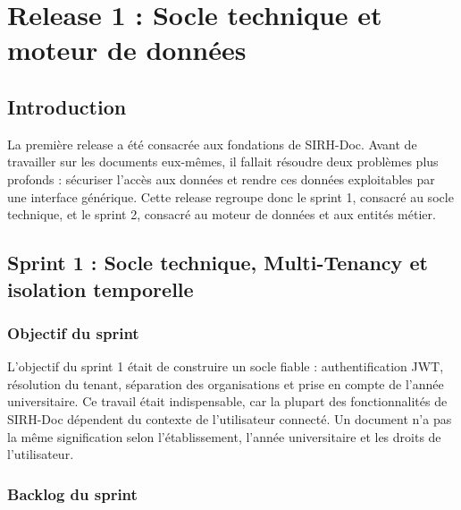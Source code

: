 
\chapter{Release 1 : Socle technique et moteur de données}

\section{Introduction}

La première release a été consacrée aux fondations de SIRH-Doc. Avant de travailler sur les documents eux-mêmes, il fallait résoudre deux problèmes plus profonds : sécuriser l'accès aux données et rendre ces données exploitables par une interface générique. Cette release regroupe donc le sprint 1, consacré au socle technique, et le sprint 2, consacré au moteur de données et aux entités métier.

\section{Sprint 1 : Socle technique, Multi-Tenancy et isolation temporelle}

\subsection{Objectif du sprint}

L'objectif du sprint 1 était de construire un socle fiable : authentification JWT, résolution du tenant, séparation des organisations et prise en compte de l'année universitaire. Ce travail était indispensable, car la plupart des fonctionnalités de SIRH-Doc dépendent du contexte de l'utilisateur connecté. Un document n'a pas la même signification selon l'établissement, l'année universitaire et les droits de l'utilisateur.

\subsection{Backlog du sprint}

\renewcommand{\arraystretch}{1.4}

